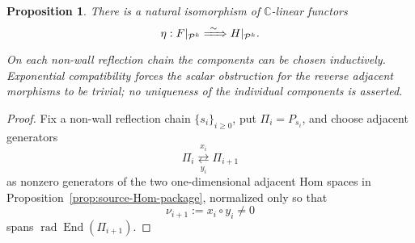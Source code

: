 \documentclass[10pt,a4paper]{amsart}
\newtheorem{prop}{Proposition}
\def\C{\mathbb{C}}
\newcommand{\End}{\operatorname{End}}
\newcommand{\rad}{\operatorname{rad}}
\begin{document}
\begin{prop}\label{prop:natural-on-projectives}
There is a natural isomorphism of $\C$-linear functors
\[
 \eta:F|_{\mathcal P^k}\xRightarrow{\ \sim\ }H|_{\mathcal P^k}.
\]
On each non-wall reflection chain the components can be chosen
inductively.  Exponential compatibility forces the scalar obstruction for
the reverse adjacent morphisms to be trivial; no uniqueness of the
individual components is asserted.
\end{prop}

\begin{proof}
Fix a non-wall reflection chain $\{s_i\}_{i\ge0}$, put
$\Pi_i=P_{s_i}$, and choose adjacent generators
\[
 \Pi_i\underset{y_i}{\stackrel{x_i}{\rightleftarrows}}\Pi_{i+1}
\]
as nonzero generators of the two one-dimensional adjacent Hom spaces in
Proposition~\ref{prop:source-Hom-package}, normalized only so that
\begin{equation}\label{eq:zigzag-loop-section6}
 \nu_{i+1}:=x_i\circ y_i\ne0
\end{equation}
spans $\rad\End(\Pi_{i+1})$.


\end{proof}
\end{document}
